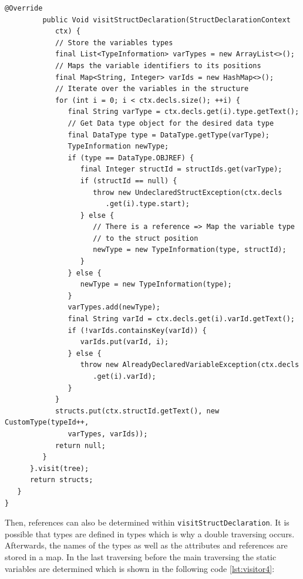 \begin{lstlisting}[frame=htrbl, caption={Implementation of {\ttfamily CustomTypeVisitor.java}}, label={lst:visitor3}, basicstyle=\footnotesize]
         @Override
         public Void visitStructDeclaration(StructDeclarationContext 
            ctx) {
            // Store the variables types
            final List<TypeInformation> varTypes = new ArrayList<>();
            // Maps the variable identifiers to its positions
            final Map<String, Integer> varIds = new HashMap<>();
            // Iterate over the variables in the structure
            for (int i = 0; i < ctx.decls.size(); ++i) {
               final String varType = ctx.decls.get(i).type.getText();
               // Get Data type object for the desired data type
               final DataType type = DataType.getType(varType);
               TypeInformation newType;
               if (type == DataType.OBJREF) {
                  final Integer structId = structIds.get(varType);
                  if (structId == null) {
                     throw new UndeclaredStructException(ctx.decls
                        .get(i).type.start);
                  } else {
                     // There is a reference => Map the variable type 
                     // to the struct position
                     newType = new TypeInformation(type, structId);
                  }
               } else {
                  newType = new TypeInformation(type);
               }
               varTypes.add(newType);
               final String varId = ctx.decls.get(i).varId.getText();
               if (!varIds.containsKey(varId)) {
                  varIds.put(varId, i);
               } else {
                  throw new AlreadyDeclaredVariableException(ctx.decls
                     .get(i).varId);
               }
            }
            structs.put(ctx.structId.getText(), new CustomType(typeId++, 
               varTypes, varIds));
            return null;
         }
      }.visit(tree);
      return structs;
   }
}
\end{lstlisting}

Then, references can also be determined within \texttt{visitStructDeclaration}. It is possible that types are defined in types which is why a double traversing occurs. Afterwards, the names of the types as well as the attributes and references are stored in a map. In the last traversing before the main traversing the static variables are determined which is shown in the following code \ref{lst:visitor4}:

